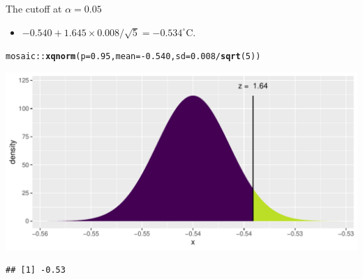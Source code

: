 \documentclass[10pt,handout]{beamer}\usepackage[]{graphicx}\usepackage[]{color}
\makeatletter
\def\maxwidth{ %
  \ifdim\Gin@nat@width>\linewidth
    \linewidth
  \else
    \Gin@nat@width
  \fi
}
\newcommand{\hlnum}[1]{\textcolor[rgb]{0.686,0.059,0.569}{#1}}%
\newcommand{\hlopt}[1]{\textcolor[rgb]{0,0,0}{#1}}%
\newcommand{\hlstd}[1]{\textcolor[rgb]{0.345,0.345,0.345}{#1}}%
\newcommand{\hlkwc}[1]{\textcolor[rgb]{0.333,0.667,0.333}{#1}}%
\newcommand{\hlkwd}[1]{\textcolor[rgb]{0.737,0.353,0.396}{\textbf{#1}}}%
\newenvironment{kframe}{%
 \def\at@end@of@kframe{}%
 \ifinner\ifhmode%
  \def\at@end@of@kframe{\end{minipage}}%
  \begin{minipage}{\columnwidth}%
 \fi\fi%
 \def\FrameCommand##1{\hskip\@totalleftmargin \hskip-\fboxsep
 \colorbox{shadecolor}{##1}\hskip-\fboxsep
     \hskip-\linewidth \hskip-\@totalleftmargin \hskip\columnwidth}%
 \MakeFramed {\advance\hsize-\width
   \@totalleftmargin\z@ \linewidth\hsize
   \@setminipage}}%
 {\par\unskip\endMakeFramed%
 \at@end@of@kframe}
\newenvironment{knitrout}{}{} %
\makeatother
\begin{document}
\begin{frame}[fragile]{The cutoff at $\alpha = 0.05$}
	\begin{itemize}
		\item $-0.540 + 1.645 \times 0.008/\sqrt{5}  = -0.534^{\circ}\textrm{C}.$
	\end{itemize}
	
\begin{knitrout}\tiny
{}\color{fgcolor}\begin{kframe}
\begin{alltt}
\hlstd{mosaic}\hlopt{::}\hlkwd{xqnorm}\hlstd{(}\hlkwc{p} \hlstd{=} \hlnum{0.95}\hlstd{,} \hlkwc{mean} \hlstd{=} \hlopt{-}\hlnum{0.540}\hlstd{,} \hlkwc{sd} \hlstd{=} \hlnum{0.008}\hlopt{/}\hlkwd{sqrt}\hlstd{(}\hlnum{5}\hlstd{))}
\end{alltt}
\end{kframe}

{\centering \includegraphics[width=\maxwidth]{figure/unnamed-chunk-6-1} 

}


\begin{kframe}\begin{verbatim}
## [1] -0.53
\end{verbatim}
\end{kframe}
\end{knitrout}
\end{frame}
\end{document}
